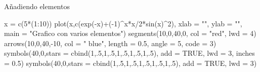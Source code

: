 \documentclass[
  ignorenonframetext,
  aspectratio=169]{beamer}
\newenvironment{Shaded}{\begin{snugshade}}{\end{snugshade}}
\newcommand{\AttributeTok}[1]{\textcolor[rgb]{0.77,0.63,0.00}{#1}}
\newcommand{\ConstantTok}[1]{\textcolor[rgb]{0.00,0.00,0.00}{#1}}
\newcommand{\DecValTok}[1]{\textcolor[rgb]{0.00,0.00,0.81}{#1}}
\newcommand{\FloatTok}[1]{\textcolor[rgb]{0.00,0.00,0.81}{#1}}
\newcommand{\FunctionTok}[1]{\textcolor[rgb]{0.00,0.00,0.00}{#1}}
\newcommand{\NormalTok}[1]{#1}
\newcommand{\OtherTok}[1]{\textcolor[rgb]{0.56,0.35,0.01}{#1}}
\newcommand{\SpecialCharTok}[1]{\textcolor[rgb]{0.00,0.00,0.00}{#1}}
\newcommand{\StringTok}[1]{\textcolor[rgb]{0.31,0.60,0.02}{#1}}
\begin{document}
\begin{frame}[fragile]{Añadiendo elementos}
\protect\hypertarget{auxf1adiendo-elementos}{}
\begin{Shaded}
\begin{Highlighting}[]
\NormalTok{x }\OtherTok{=} \FunctionTok{c}\NormalTok{(}\DecValTok{5}\SpecialCharTok{*}\NormalTok{(}\DecValTok{1}\SpecialCharTok{:}\DecValTok{10}\NormalTok{))}
\FunctionTok{plot}\NormalTok{(x,}\FunctionTok{c}\NormalTok{(}\FunctionTok{exp}\NormalTok{(}\SpecialCharTok{{-}}\NormalTok{x)}\SpecialCharTok{+}\NormalTok{(}\SpecialCharTok{{-}}\DecValTok{1}\NormalTok{)}\SpecialCharTok{\^{}}\NormalTok{x}\SpecialCharTok{*}\NormalTok{x}\SpecialCharTok{/}\DecValTok{2}\SpecialCharTok{*}\FunctionTok{sin}\NormalTok{(x)}\SpecialCharTok{\^{}}\DecValTok{2}\NormalTok{), }\AttributeTok{xlab =} \StringTok{""}\NormalTok{, }\AttributeTok{ylab =} \StringTok{""}\NormalTok{, }
     \AttributeTok{main =} \StringTok{"Grafico con varios elementos"}\NormalTok{)}
\FunctionTok{segments}\NormalTok{(}\DecValTok{10}\NormalTok{,}\DecValTok{0}\NormalTok{,}\DecValTok{40}\NormalTok{,}\DecValTok{0}\NormalTok{, }\AttributeTok{col =} \StringTok{"red"}\NormalTok{, }\AttributeTok{lwd =} \DecValTok{4}\NormalTok{)}
\FunctionTok{arrows}\NormalTok{(}\DecValTok{10}\NormalTok{,}\DecValTok{0}\NormalTok{,}\DecValTok{40}\NormalTok{,}\SpecialCharTok{{-}}\DecValTok{10}\NormalTok{, }\AttributeTok{col =} \StringTok{" blue"}\NormalTok{, }\AttributeTok{length =} \FloatTok{0.5}\NormalTok{,}
       \AttributeTok{angle =} \DecValTok{5}\NormalTok{, }\AttributeTok{code =} \DecValTok{3}\NormalTok{)}
\FunctionTok{symbols}\NormalTok{(}\DecValTok{40}\NormalTok{,}\DecValTok{0}\NormalTok{,}\AttributeTok{stars =} \FunctionTok{cbind}\NormalTok{(}\DecValTok{1}\NormalTok{,.}\DecValTok{5}\NormalTok{,}\DecValTok{1}\NormalTok{,.}\DecValTok{5}\NormalTok{,}\DecValTok{1}\NormalTok{,.}\DecValTok{5}\NormalTok{,}\DecValTok{1}\NormalTok{,.}\DecValTok{5}\NormalTok{,}\DecValTok{1}\NormalTok{,.}\DecValTok{5}\NormalTok{), }
        \AttributeTok{add =} \ConstantTok{TRUE}\NormalTok{, }\AttributeTok{lwd =} \DecValTok{3}\NormalTok{, }\AttributeTok{inches =} \FloatTok{0.5}\NormalTok{)}
\FunctionTok{symbols}\NormalTok{(}\DecValTok{40}\NormalTok{,}\DecValTok{0}\NormalTok{,}\AttributeTok{stars =} \FunctionTok{cbind}\NormalTok{(}\DecValTok{1}\NormalTok{,.}\DecValTok{5}\NormalTok{,}\DecValTok{1}\NormalTok{,.}\DecValTok{5}\NormalTok{,}\DecValTok{1}\NormalTok{,.}\DecValTok{5}\NormalTok{,}\DecValTok{1}\NormalTok{,.}\DecValTok{5}\NormalTok{,}\DecValTok{1}\NormalTok{,.}\DecValTok{5}\NormalTok{),}
        \AttributeTok{add =} \ConstantTok{TRUE}\NormalTok{, }\AttributeTok{lwd =} \DecValTok{3}\NormalTok{)}

\end{Highlighting}
\end{Shaded}
\end{frame}
\end{document}
